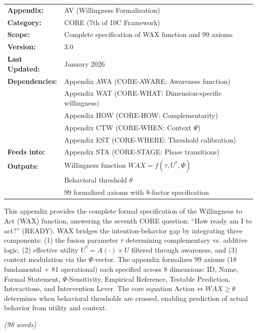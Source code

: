 \begin{tcolorbox}[colback=blue!5!white, colframe=blue!75!black,
    title=\textbf{Appendix REA: CORE-READY}]

\begin{tabular}{@{}ll@{}}
\textbf{Appendix:} & AV (Willingness Formalization) \\
\textbf{Category:} & CORE (7th of 10C Framework) \\
\textbf{Scope:} & Complete specification of WAX function and 99 axioms \\
\textbf{Version:} & 3.0 \\
\textbf{Last Updated:} & January 2026 \\
\textbf{Dependencies:} & Appendix AWA (CORE-AWARE: Awareness function) \\
                       & Appendix WAT (CORE-WHAT: Dimension-specific willingness) \\
                       & Appendix HOW (CORE-HOW: Complementarity) \\
                       & Appendix CTW (CORE-WHEN: Context $\Psi$) \\
                       & Appendix EST (CORE-WHERE: Threshold calibration) \\
\textbf{Feeds into:}   & Appendix STA (CORE-STAGE: Phase transitions) \\
\textbf{Outputs:} & Willingness function $WAX = f(\tau, U^*, \Psi)$ \\
                  & Behavioral threshold $\theta$ \\
                  & 99 formalized axioms with 8-factor specification \\
\end{tabular}

\end{tcolorbox}


\begin{tcolorbox}[colback=white, colframe=black,
    title=\textbf{Abstract}]

This appendix provides the complete formal specification of the Willingness to Act (WAX) function,
answering the seventh CORE question: ``How ready am I to act?'' (READY). WAX bridges the
intention-behavior gap by integrating three components: (1) the fusion parameter $\tau$ determining
complementary vs. additive logic, (2) effective utility $U^* = A(\cdot) \times U$ filtered through
awareness, and (3) context modulation via the $\Psi$-vector. The appendix formalizes 99 axioms
(18 fundamental + 81 operational) each specified across 8 dimensions: ID, Name, Formal Statement,
$\Psi$-Sensitivity, Empirical Reference, Testable Prediction, Interactions, and Intervention Lever.
The core equation $\text{Action} \Leftrightarrow WAX \geq \theta$ determines when behavioral
thresholds are crossed, enabling prediction of actual behavior from utility and context.

\textit{(98 words)}

\end{tcolorbox}

